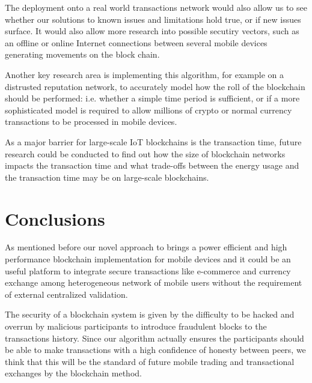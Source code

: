 \documentclass[journal]{IEEEtran}
\begin{document}
The deployment onto a real world transactions network would also allow us to see whether our solutions to known issues and limitations hold true, or if new issues surface. It would also allow more research into possible secutiry vectors, such as an offline or online Internet connections between several mobile devices generating movements on the block chain.

Another key research area is implementing this algorithm, for example on a distrusted reputation network, to accurately model how the roll of the blockchain should be performed: i.e. whether a simple time period is sufficient, or if a more sophisticated model is required to allow millions of crypto or normal currency transactions to be processed in mobile devices.

As a major barrier for large-scale IoT blockchains is the transaction time, future research could be conducted to find out how the size of blockchain networks impacts the transaction time and what trade-offs between the energy usage and the transaction time may be on large-scale blockchains.



\section{Conclusions}
As mentioned before our novel approach to brings a power efficient and high performance blockchain implementation for mobile devices and it could be an useful platform to integrate secure transactions like e-commerce and currency exchange among heterogeneous network of mobile users without the requirement of external centralized validation.

The security of a blockchain system is given by the difficulty to be hacked and overrun by malicious participants to introduce fraudulent blocks to the transactions history. Since our algorithm actually ensures the participants should be able to make transactions with a high confidence of honesty between peers, we think that this will be the standard of future mobile trading and transactional exchanges by the blockchain method.






\end{document}
